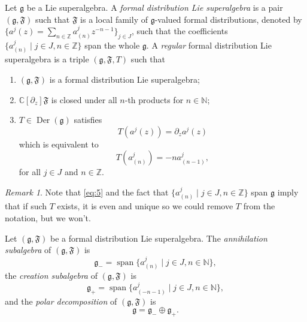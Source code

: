 \documentclass[a4paper, 12pt, reqno]{amsart}
\theoremstyle{remark}
\newtheorem{remark}[theorem]{Remark}
\numberwithin{equation}{subsection}
\DeclareMathOperator{\vspan}{span}
\DeclareMathOperator{\Der}{Der}
\begin{document}
Let $\mathfrak{g}$ be a Lie superalgebra.
A \emph{formal distribution Lie superalgebra} is a pair $(\mathfrak{g}, \mathfrak{F})$ such that $\mathfrak{F}$ is a local family of $\mathfrak{g}$-valued formal distributions, denoted by $\{a^j(z) = \sum_{n \in \mathbb{Z}}a^j_{(n)}z^{-n - 1}\}_{j \in J}$, such that the coefficients $\{a^j_{(n)} \mid j \in J, n \in \mathbb{Z}\}$ span the whole $\mathfrak{g}$.
A \emph{regular} formal distribution Lie superalgebra is a triple $(\mathfrak{g}, \mathfrak{F}, T)$ such that
\begin{enumerate}
\item $(\mathfrak{g}, \mathfrak{F})$ is a formal distribution Lie superalgebra;
\item $\mathbb{C}[\partial_z]\mathfrak{F}$ is closed under all $n$-th products for $n \in \mathbb{N}$;
\item $T \in \Der(\mathfrak{g})$ satisfies
  \begin{equation*}
    T(a^j(z)) = \partial_za^j(z)
  \end{equation*}
  which is equivalent to
  \begin{equation}
    \label{eq:5}
    T(a^j_{(n)}) = -na^j_{(n - 1)},
  \end{equation}
  for all $j \in J$ and $n \in \mathbb{Z}$. 
\end{enumerate}
\begin{remark}
  \label{rmk:4}
  Note that \eqref{eq:5} and the fact that $\{a^j_{(n)} \mid j \in J, n \in \mathbb{Z}\}$ span $\mathfrak{g}$ imply that if such $T$ exists, it is even and unique so we could remove $T$ from the notation, but we won't.
\end{remark}

Let $(\mathfrak{g}, \mathfrak{F})$ be a formal distribution Lie superalgebra.
The \emph{annihilation subalgebra} of $(\mathfrak{g}, \mathfrak{F})$ is
\begin{equation*}
  \mathfrak{g}_- = \vspan\{a^j_{(n)} \mid j \in J, n \in \mathbb{N}\},
\end{equation*}
the \emph{creation subalgebra} of $(\mathfrak{g}, \mathfrak{F})$ is
\begin{equation*}
  \mathfrak{g}_+ = \vspan\{a^j_{(-n - 1)} \mid j \in J, n \in \mathbb{N}\},
\end{equation*}
and the \emph{polar decomposition} of $(\mathfrak{g}, \mathfrak{F})$ is
\begin{equation*}
  \mathfrak{g} = \mathfrak{g}_- \oplus \mathfrak{g}_+.
\end{equation*}
\end{document}
